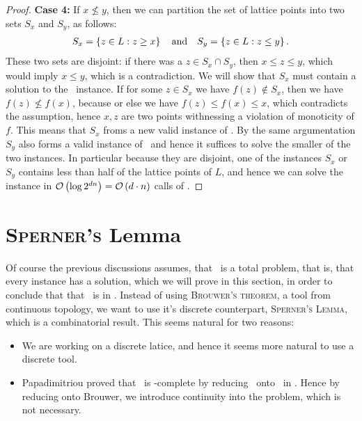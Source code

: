 \begin{proof}
    \textbf{Case 4:} If $x \not\leq y$, then we can partition the set of lattice points into two sets $S_x$ and $S_y$, as follows:
    \begin{align*}
        S_x = \left\{z \in L : z \geq x\right\} \quad \text{and} \quad S_y = \left\{z \in L : z \leq y\right\}.
    \end{align*}
    These two sets are disjoint: if there was a $z \in S_x \cap S_y$, then $x \leq z \leq y$, which would imply $x \leq y$, which is a contradiction. We will show that $S_x$ must contain a solution to the \Tarski\ instance.
    If for some $z \in S_x$ we have $f(z) \not\in S_x$, then we have $f(z) \not\leq f(x)$, because or else we have $f(z) \leq f(x) \leq x$, which contradicts the assumption, hence $x, z$ are two points withnessing a violation of monoticity of $f$. This means that $S_x$ froms a new valid instance of \Tarski. By the same argumentation $S_y$ also forms a valid instance of \Tarski\ and hence it suffices to solve the smaller of the two instances. In particular because they are disjoint, one of the instances $S_x$ or $S_y$ contains less than half of the lattice points of $L$, and hence we can solve the instance in $\mathcal{O}\left(\log{2^{dn}}\right) = \mathcal{O}\left(d \cdot n\right)$ calls of \Tarskistar.
\end{proof}

\section{\textsc{Sperner's} Lemma}

Of course the previous discussions assumes, that \Tarskistar\ is a total problem, that is, that every instance has a solution, which we will prove in this section, in order to conclude that that \Tarskistar\ is in \TFNP. Instead of using \textsc{Brouwer's theorem}, a tool from continuous topology, we want to use it's discrete counterpart, \textsc{Sperner's Lemma}, which is a combinatorial result. This seems natural for two reasons:
\begin{itemize}
    \item We are working on a discrete latice, and hence it seems more natural to use a discrete tool.
    \item Papadimitriou proved that \Brouwer\ is \PPAD-complete by reducing \Brouwer\ onto \Sperner\ in . Hence by reducing onto Brouwer, we introduce continuity into the problem, which is not necessary.
\end{itemize}

